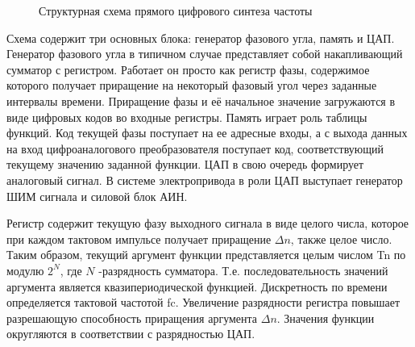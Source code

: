         \begin{figure}[h!]
            \caption{Структурная схема прямого цифрового синтеза частоты}
            \label{fig:dds-structure}
        \end{figure}

        Схема содержит три основных блока: генератор фазового угла, память и
        ЦАП. Генератор фазового угла в типичном случае представляет собой
        накапливающий сумматор с регистром. Работает он просто как регистр
        фазы, содержимое которого получает приращение на некоторый фазовый угол
        через заданные интервалы времени. Приращение фазы и её начальное
        значение загружаются в виде цифровых кодов во входные регистры. Память
        играет роль таблицы функций. Код текущей фазы поступает на ее адресные
        входы, а с выхода данных на вход цифроаналогового преобразователя
        поступает код, соответствующий текущему значению заданной функции.  ЦАП
        в свою очередь формирует аналоговый сигнал. В системе электропривода в
        роли ЦАП выступает генератор ШИМ сигнала и силовой блок АИН.

        Регистр содержит текущую фазу выходного сигнала в виде целого числа,
        которое при каждом тактовом импульсе получает приращение $\Delta n$,
        также целое число. Таким образом, текущий аргумент функции
        представляется целым числом Tn по модулю $2^N$, где $N$ -разрядность
        сумматора. Т.е.  последовательность значений аргумента является
        квазипериодической функцией. Дискретность по времени определяется
        тактовой частотой fc.  Увеличение разрядности регистра повышает
        разрешающую способность приращения аргумента $\Delta n$. Значения
        функции округляются в соответствии с разрядностью ЦАП.

